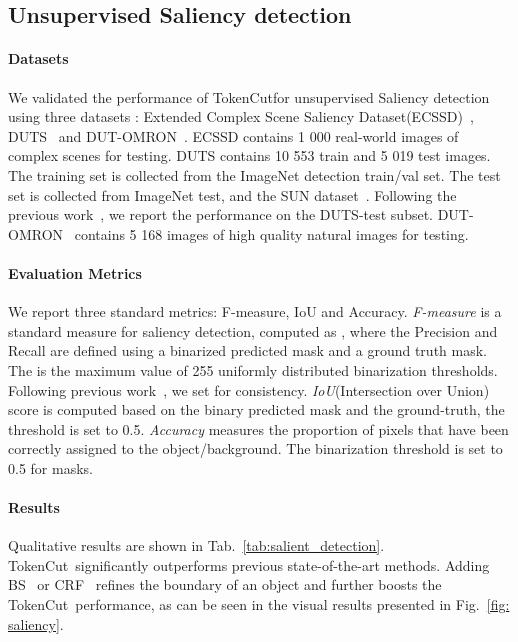 \documentclass[twocolumn]{article}
\newcommand{\name} {TokenCut}
\begin{document}
\subsection{Unsupervised Saliency detection}
\label{sec:unsupervised_saliency_detection}

\paragraph*{Datasets}
We validated the performance of \name for unsupervised Saliency detection using three datasets : Extended Complex Scene Saliency Dataset(ECSSD)~\cite{shi2015hierarchical}, DUTS~\cite{wang2017learning} and DUT-OMRON~\cite{yang2013saliency}. ECSSD contains 1 000 real-world images of complex scenes for testing. 
DUTS contains 10 553 train and 5 019 test images. The training set is collected from the ImageNet detection train/val set. The test set is collected from ImageNet test, and the SUN dataset~\cite{Xiao2010Sun}. Following the previous work~\cite{shen2021learning}, we report the performance on the DUTS-test subset. DUT-OMRON~\cite{yang2013saliency} contains 5 168 images of high quality natural images for testing.

\paragraph*{Evaluation Metrics}
We report three standard metrics: F-measure, IoU and Accuracy. \textit{F-measure} is a standard measure for saliency detection, computed as , where the Precision and Recall are defined using a binarized predicted mask and a ground truth mask. The  is the maximum value of 255 uniformly distributed binarization thresholds. Following previous work~\cite{shen2021learning,voynov2021object}, we set  for consistency. \textit{IoU}(Intersection over Union) score is computed based on the binary predicted mask and the ground-truth, the threshold is set to 0.5. \textit{Accuracy} measures the proportion of pixels that have been correctly assigned to the object/background. The binarization threshold is set to 0.5 for masks. 
 

\paragraph*{Results}
Qualitative results are shown in Tab.~\ref{tab:salient_detection}. \name~significantly outperforms previous state-of-the-art methods. Adding BS~\cite{barron2016fast} or CRF~\cite{krahenbuhl2011efficient} refines the boundary of an object and further boosts the \name~performance, as can  be seen in the visual results presented in Fig.~\ref{fig: saliency}.
\end{document}
